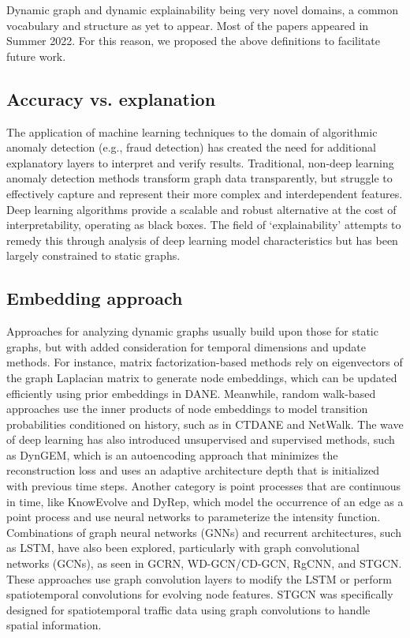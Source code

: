 Dynamic graph and dynamic explainability being very novel domains, a common vocabulary and structure as yet to appear. Most of the papers appeared in Summer 2022. For this reason, we proposed the above definitions to facilitate future work.

\subsection{Accuracy vs. explanation}
The application of machine learning techniques to the domain of algorithmic anomaly detection (e.g., fraud detection) has created the need for additional explanatory layers to interpret and verify results. Traditional, non-deep learning anomaly detection methods transform graph data transparently, but struggle to effectively capture and represent their more complex and interdependent features. Deep learning algorithms provide a scalable and robust alternative at the cost of interpretability, operating as black boxes. The field of ‘explainability’ attempts to remedy this through analysis of deep learning model characteristics but has been largely constrained to static graphs.

\subsection{Embedding approach}
Approaches for analyzing dynamic graphs usually build upon those for static graphs, but with added consideration for temporal dimensions and update methods. For instance, matrix factorization-based methods rely on eigenvectors of the graph Laplacian matrix to generate node embeddings, which can be updated efficiently using prior embeddings in DANE. Meanwhile, random walk-based approaches use the inner products of node embeddings to model transition probabilities conditioned on history, such as in CTDANE and NetWalk. The wave of deep learning has also introduced unsupervised and supervised methods, such as DynGEM, which is an autoencoding approach that minimizes the reconstruction loss and uses an adaptive architecture depth that is initialized with previous time steps. Another category is point processes that are continuous in time, like KnowEvolve and DyRep, which model the occurrence of an edge as a point process and use neural networks to parameterize the intensity function. Combinations of graph neural networks (GNNs) and recurrent architectures, such as LSTM, have also been explored, particularly with graph convolutional networks (GCNs), as seen in GCRN, WD-GCN/CD-GCN, RgCNN, and STGCN. These approaches use graph convolution layers to modify the LSTM or perform spatiotemporal convolutions for evolving node features. STGCN was specifically designed for spatiotemporal traffic data using graph convolutions to handle spatial information.\cite{egcn}



